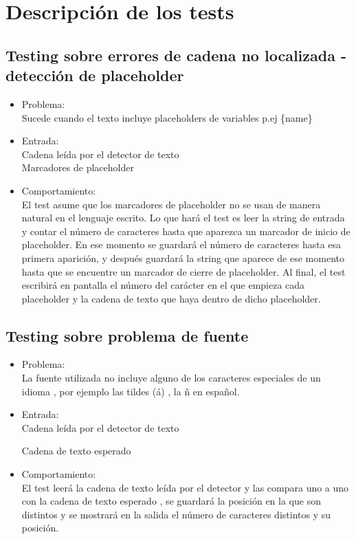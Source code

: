 \section{Descripción de los tests}
\subsection{Testing sobre errores de cadena no localizada - detección de placeholder}
\begin{itemize}
	\item Problema: \\
	Sucede cuando el texto incluye placeholders de variables p.ej \{name\}  \\
	\item Entrada: \\
	Cadena leída por el detector de texto \\
	Marcadores de placeholder \\
	\item Comportamiento: \\
	El test asume que los marcadores de placeholder no se usan de manera natural en el lenguaje escrito.
	Lo que hará el test es leer la string de entrada y contar el número de caracteres hasta que aparezca un marcador de inicio de placeholder. En ese momento se guardará el número de caracteres hasta esa primera aparición, y después guardará la string que aparece de ese momento hasta que se encuentre un marcador de cierre de placeholder. 
	Al final, el test escribirá en pantalla el número del carácter en el que empieza cada placeholder y la cadena de texto que haya dentro de dicho placeholder.
\end{itemize}

\subsection{Testing sobre problema de fuente
}
\begin{itemize}
	\item Problema: \\
	La fuente utilizada no incluye alguno de los caracteres especiales de un idioma , por ejemplo las tildes (á) , la ñ en español.  \\
	\item Entrada: \\
	Cadena leída por el detector de texto
	
	Cadena de texto esperado
	
	\item Comportamiento: \\
	El test leerá la cadena de texto leída por el detector y las compara uno a uno con la cadena de texto esperado , se guardará la posición en la que son distintos y se mostrará en la salida el número de caracteres distintos y su posición.
	
\end{itemize}




